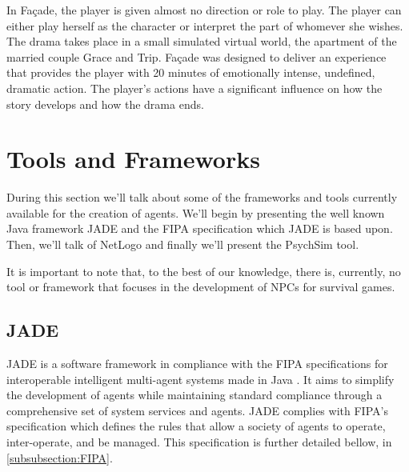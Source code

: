 \noindent In Façade\cite{mateas:facade}, the player is given almost no direction or role to play.
The player can either play herself as the character or interpret the part of whomever she wishes.
The drama takes place in a small simulated virtual world, the apartment of the married couple Grace and Trip.
Façade was designed to deliver an experience that provides the player with 20 minutes of emotionally intense, undefined, dramatic action.
The player's actions have a significant influence on how the story develops and how the drama ends.



\section{Tools and Frameworks}

\noindent During this section we'll talk about some of the frameworks and tools currently available for the creation of agents.
We'll begin by presenting the well known Java framework \ac{JADE} and the \ac{FIPA} specification which \ac{JADE} is based upon.
Then, we'll talk of NetLogo and finally we'll present the PsychSim tool.

It is important to note that, to the best of our knowledge, there is, currently, no tool or framework that focuses in the development of \acp{NPC} for survival games.

\subsection{JADE}

\noindent \ac{JADE} is a software framework in compliance with the \ac{FIPA} specifications for interoperable intelligent multi-agent systems made in Java \cite{bellifemine:jade}.
It aims to simplify the development of agents while maintaining standard compliance through a comprehensive set of system services and agents.
\ac{JADE} complies with \ac{FIPA}'s specification \cite{obrien:FIPA} which defines the rules that allow a society of agents to operate, inter-operate, and be managed. This specification is further detailed bellow, in \ref{subsubsection:FIPA}.

